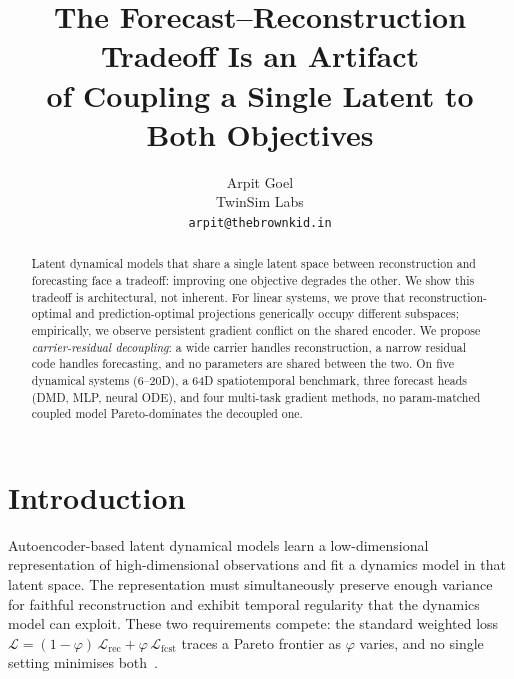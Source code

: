 \documentclass{article}
\title{The Forecast--Reconstruction Tradeoff Is an Artifact\\of Coupling a Single Latent to Both Objectives}
\author{Arpit Goel \\
TwinSim Labs \\
\texttt{arpit@thebrownkid.in}}
\begin{document}
\maketitle

\begin{abstract}
Latent dynamical models that share a single latent space between
reconstruction and forecasting face a tradeoff: improving one
objective degrades the other.  We show this tradeoff is
architectural, not inherent.  For linear systems, we prove that
reconstruction-optimal and prediction-optimal projections
generically occupy different subspaces; empirically, we observe
persistent gradient conflict on the shared encoder.
We propose \emph{carrier-residual decoupling}: a wide carrier
handles reconstruction, a narrow residual code handles forecasting,
and no parameters are shared between the two.
On five dynamical systems (6--20D), a 64D spatiotemporal benchmark,
three forecast heads (DMD, MLP, neural ODE), and four multi-task
gradient methods, no param-matched coupled model Pareto-dominates
the decoupled one.
\end{abstract}


\section{Introduction}
\label{sec:intro}

Autoencoder-based latent dynamical models learn a low-dimensional
representation of high-dimensional observations and fit a dynamics
model in that latent space.  The representation must simultaneously
preserve enough variance for faithful reconstruction and exhibit
temporal regularity that the dynamics model can exploit.  These two
requirements compete: the standard weighted loss
$\mathcal{L} = (1{-}\varphi)\,\mathcal{L}_{\mathrm{rec}} +
\varphi\,\mathcal{L}_{\mathrm{fcst}}$
traces a Pareto frontier as $\varphi$ varies, and no single setting
minimises both~\citep{lusch2018deep,otto2019linearly}.
\end{document}
